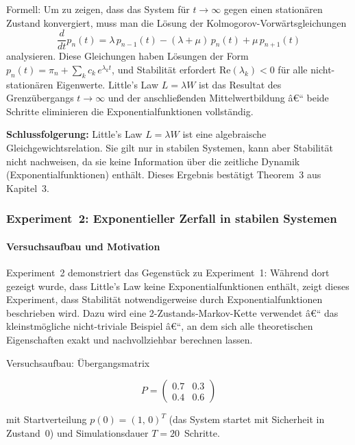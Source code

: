 ﻿\documentclass[a4paper,12pt]{scrreprt}
\theoremstyle{definition}
\begin{document}
Formell: Um zu zeigen, dass das System für $t \to \infty$ gegen einen
stationären Zustand konvergiert, muss man die Lösung der
Kolmogorov-Vorwärtsgleichungen
\[
\frac{d}{dt}p_n(t) = \lambda\, p_{n-1}(t) - (\lambda+\mu)\,p_n(t)
+ \mu\, p_{n+1}(t)
\]
analysieren.  Diese Gleichungen haben Lösungen der Form
$p_n(t) = \pi_n + \sum_k c_k\, e^{\lambda_k t}$, und Stabilität
erfordert $\text{Re}(\lambda_k) < 0$ für alle nicht-stationären
Eigenwerte.  Little's Law $L = \lambda W$ ist das Resultat des
Grenzübergangs $t \to \infty$ und der anschließenden
Mittelwertbildung â€“ beide Schritte eliminieren die
Exponentialfunktionen vollständig.

\textbf{Schlussfolgerung:} Little's Law $L = \lambda W$ ist eine
algebraische Gleichgewichtsrelation.  Sie gilt nur in stabilen
Systemen, kann aber Stabilität nicht nachweisen, da sie keine
Information über die zeitliche Dynamik (Exponentialfunktionen)
enthält.  Dieses Ergebnis bestätigt Theorem~3 aus Kapitel~3.

\subsubsection{Experiment~2: Exponentieller Zerfall in stabilen Systemen}
\label{subsubsec:exp2}

\paragraph{Versuchsaufbau und Motivation}

Experiment~2 demonstriert das Gegenstück zu Experiment~1: Während
dort gezeigt wurde, dass Little's Law keine Exponentialfunktionen
enthält, zeigt dieses Experiment, dass Stabilität notwendigerweise
durch Exponentialfunktionen beschrieben wird.  Dazu wird eine
2-Zustands-Markov-Kette verwendet â€“ das kleinstmögliche nicht-triviale
Beispiel â€“, an dem sich alle theoretischen Eigenschaften exakt und
nachvollziehbar berechnen lassen.

Versuchsaufbau: Übergangsmatrix

\begin{equation}
	P = \begin{pmatrix} 0.7 & 0.3 \\ 0.4 & 0.6 \end{pmatrix}
\end{equation}

mit Startverteilung $p(0) = (1,\, 0)^T$ (das System startet mit
Sicherheit in Zustand~0) und Simulationsdauer $T = 20$~Schritte.
\end{document}
